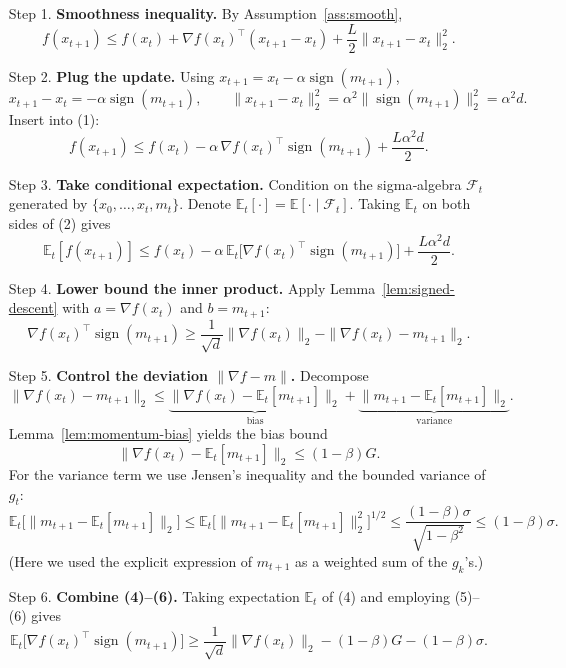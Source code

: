 \documentclass[11pt]{article}
\newcommand{\sign}{\operatorname{sign}}
\newcommand{\E}{\mathbb{E}}
\begin{document}
\begin{enumerate}
\item[Step 1.] \textbf{Smoothness inequality.}  
By Assumption~\ref{ass:smooth},
\[
f(x_{t+1})\le f(x_t)+\nabla f(x_t)^{\top}(x_{t+1}-x_t)
                +\frac{L}{2}\|x_{t+1}-x_t\|_2^{2}. \tag{1}
\]

\item[Step 2.] \textbf{Plug the update.}  
Using $x_{t+1}=x_t-\alpha\sign(m_{t+1})$,
\[
x_{t+1}-x_t = -\alpha\sign(m_{t+1}),\qquad
\|x_{t+1}-x_t\|_2^{2}= \alpha^{2}\|\sign(m_{t+1})\|_2^{2}= \alpha^{2}d.
\] 
Insert into (1):
\[
f(x_{t+1})\le f(x_t)-\alpha\,\nabla f(x_t)^{\top}\sign(m_{t+1})
            +\frac{L\alpha^{2}d}{2}. \tag{2}
\]

\item[Step 3.] \textbf{Take conditional expectation.}  
Condition on the sigma‑algebra $\mathcal{F}_t$ generated by $\{x_0,\dots,x_t,m_t\}$.
Denote $\E_t[\cdot]=\E[\cdot\mid\mathcal{F}_t]$.  Taking $\E_t$ on both sides of (2) gives
\[
\E_t[f(x_{t+1})]\le f(x_t)-\alpha\,\E_t\!\big[\nabla f(x_t)^{\top}\sign(m_{t+1})\big]
            +\frac{L\alpha^{2}d}{2}. \tag{3}
\]

\item[Step 4.] \textbf{Lower bound the inner product.}  
Apply Lemma~\ref{lem:signed-descent} with $a=\nabla f(x_t)$ and $b=m_{t+1}$:
\[
\nabla f(x_t)^{\top}\sign(m_{t+1})
   \ge \frac{1}{\sqrt{d}}\|\nabla f(x_t)\|_{2}
        -\|\nabla f(x_t)-m_{t+1}\|_{2}. \tag{4}
\]

\item[Step 5.] \textbf{Control the deviation $\|\nabla f-m\|$.}  
Decompose
\[
\|\nabla f(x_t)-m_{t+1}\|_{2}
\le \underbrace{\|\nabla f(x_t)-\E_t[m_{t+1}]\|_{2}}_{\text{bias}}
   + \underbrace{\|m_{t+1}-\E_t[m_{t+1}]\|_{2}}_{\text{variance}}.
\] 
Lemma~\ref{lem:momentum-bias} yields the bias bound
\[
\|\nabla f(x_t)-\E_t[m_{t+1}]\|_{2}\le (1-\beta)G. \tag{5}
\]
For the variance term we use Jensen’s inequality and the bounded variance of $g_t$:
\[
\E_t\big[\|m_{t+1}-\E_t[m_{t+1}]\|_{2}\big]
      \le \E_t\big[\|m_{t+1}-\E_t[m_{t+1}]\|_{2}^{2}\big]^{1/2}
      \le \frac{(1-\beta)\sigma}{\sqrt{1-\beta^{2}}}
      \le (1-\beta) \sigma . \tag{6}
\]
(Here we used the explicit expression of $m_{t+1}$ as a weighted sum of the $g_k$'s.)

\item[Step 6.] \textbf{Combine (4)–(6).}  
Taking expectation $\E_t$ of (4) and employing (5)–(6) gives
\[
\E_t\!\big[\nabla f(x_t)^{\top}\sign(m_{t+1})\big]
   \ge \frac{1}{\sqrt{d}}\|\nabla f(x_t)\|_{2}
        -(1-\beta)G-(1-\beta)\sigma . \tag{7}
\]


\end{enumerate}
\end{document}
